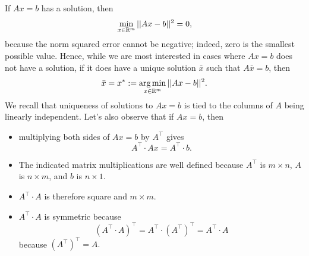 If $Ax=b$ has a solution, then 
$$\min_{x \in \mathbb R^m} ||Ax-b ||^2 = 0, $$
because the norm squared error cannot be negative; indeed, zero is the smallest possible value. Hence, while we are most interested in cases where $Ax=b$ does not have a solution, if it does have a unique solution $\bar{x}$ such that $A\bar{x}=b$, then
$$\bar{x} = x^\ast := \operatorname*{arg\,min}_{x \in \mathbb R^m} ||Ax-b ||^2 .$$
We recall that uniqueness of solutions to $Ax=b$ is tied to the columns of $A$ being linearly independent. Let's also observe that if $Ax=b$, then 
\begin{itemize}
    \item multiplying both sides of $Ax=b$ by $A^\top$ gives
$$A^\top \cdot  A x = A^\top \cdot b. $$
\item The indicated matrix multiplications are well defined because $A^\top$ is $m \times n$, $A$ is $n \times m$, and $b$ is $n \times 1$. 
\item $A^\top \cdot  A$ is therefore square and $m \times m$.
\item $A^\top \cdot  A$ is symmetric because 
$$\left( A^\top \cdot  A\right)^\top = A^\top \cdot \left(A^\top \right)^\top =A^\top \cdot  A $$
because $\left(A^\top \right)^\top = A.$
\end{itemize}



